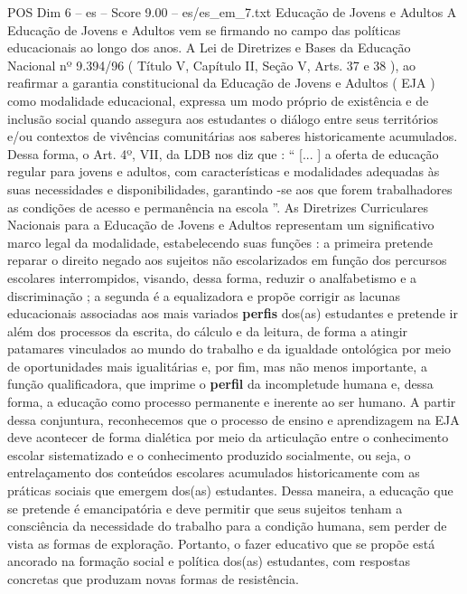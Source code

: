 \begin{textsample}{POS Dim 6 – es – Score 9.00 – es/es\_em\_7.txt}  \label{ex:f6_pos_145}
Educação de Jovens e Adultos A Educação de Jovens e Adultos vem se firmando no campo das políticas educacionais ao longo dos anos.
A Lei de Diretrizes e Bases da Educação Nacional nº 9.394/96 ( Título V, Capítulo II, Seção V, Arts. 37 e 38 ), ao reafirmar a garantia constitucional da Educação de Jovens e Adultos ( EJA ) como modalidade educacional, expressa um modo próprio de existência e de inclusão social quando assegura aos estudantes o diálogo entre seus territórios e/ou contextos de vivências comunitárias aos saberes historicamente acumulados.
Dessa forma, o Art. 4º, VII, da LDB nos diz que : “ [... ] a oferta de educação regular para jovens e adultos, com características e modalidades adequadas às suas necessidades e disponibilidades, garantindo -se aos que forem trabalhadores as condições de acesso e permanência na escola ”.
As Diretrizes Curriculares Nacionais para a Educação de Jovens e Adultos representam um significativo marco legal da modalidade, estabelecendo suas funções : a primeira pretende reparar o direito negado aos sujeitos não escolarizados em função dos percursos escolares interrompidos, visando, dessa forma, reduzir o analfabetismo e a discriminação ; a segunda é a equalizadora e propõe corrigir as lacunas educacionais associadas aos mais variados \textbf{perfis} dos(as) estudantes e pretende ir além dos processos da escrita, do cálculo e da leitura, de forma a atingir patamares vinculados ao mundo do trabalho e da igualdade ontológica por meio de oportunidades mais igualitárias e, por fim, mas não menos importante, a função qualificadora, que imprime o \textbf{perfil} da incompletude humana e, dessa forma, a educação como processo permanente e inerente ao ser humano.
A partir dessa conjuntura, reconhecemos que o processo de ensino e aprendizagem na EJA deve acontecer de forma dialética por meio da articulação entre o conhecimento escolar sistematizado e o conhecimento produzido socialmente, ou seja, o entrelaçamento dos conteúdos escolares acumulados historicamente com as práticas sociais que emergem dos(as) estudantes.
Dessa maneira, a educação que se pretende é emancipatória e deve permitir que seus sujeitos tenham a consciência da necessidade do trabalho para a condição humana, sem perder de vista as formas de exploração.
Portanto, o fazer educativo que se propõe está ancorado na formação social e política dos(as) estudantes, com respostas concretas que produzam novas formas de resistência.

\end{textsample}
